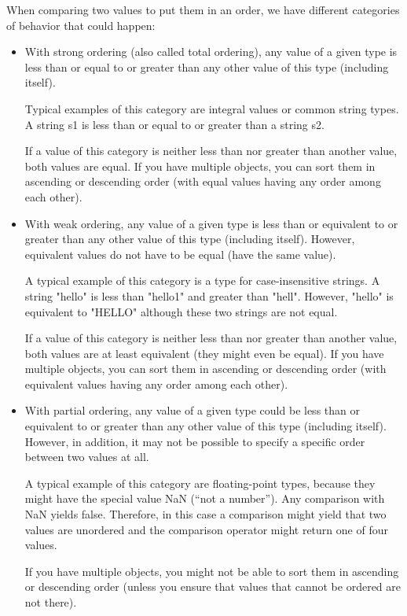
When comparing two values to put them in an order, we have different categories of behavior that could happen:

\begin{itemize}
\item
With strong ordering (also called total ordering), any value of a given type is less than or equal to or greater than any other value of this type (including itself).

Typical examples of this category are integral values or common string types. A string s1 is less than or equal to or greater than a string s2.

If a value of this category is neither less than nor greater than another value, both values are equal. If you have multiple objects, you can sort them in ascending or descending order (with equal values having any order among each other).

\item
With weak ordering, any value of a given type is less than or equivalent to or greater than any other value of this type (including itself). However, equivalent values do not have to be equal (have the same value).

A typical example of this category is a type for case-insensitive strings. A string "hello" is less than "hello1" and greater than "hell". However, "hello" is equivalent to "HELLO" although these two strings are not equal.

If a value of this category is neither less than nor greater than another value, both values are at least equivalent (they might even be equal). If you have multiple objects, you can sort them in ascending or descending order (with equivalent values having any order among each other).

\item
With partial ordering, any value of a given type could be less than or equivalent to or greater than any other value of this type (including itself). However, in addition, it may not be possible to specify a specific order between two values at all.

A typical example of this category are floating-point types, because they might have the special value NaN (“not a number”). Any comparison with NaN yields false. Therefore, in this case a comparison might yield that two values are unordered and the comparison operator might return one of four values.

If you have multiple objects, you might not be able to sort them in ascending or descending order (unless you ensure that values that cannot be ordered are not there).
\end{itemize}

